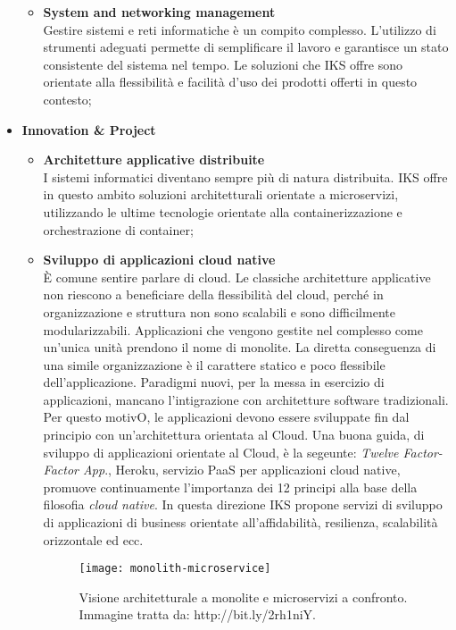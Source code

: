 \begin{itemize}
\begin{itemize}
		\item \textbf{System and networking management}\\
		Gestire sistemi e reti informatiche è un compito complesso. 
		L'utilizzo di strumenti adeguati permette di semplificare il 
		lavoro e garantisce un stato consistente del sistema nel tempo. 
		Le soluzioni che IKS offre sono orientate alla flessibilità e 
		facilità d'uso dei prodotti offerti in questo contesto;
	\end{itemize} 
	\item \textbf{Innovation \& Project} \\
	\begin{itemize}
		\item \textbf{Architetture applicative distribuite}\\
		I sistemi informatici diventano sempre più di natura 
		distribuita. IKS offre in questo ambito soluzioni architetturali 
		orientate a microservizi, utilizzando le ultime tecnologie 
		orientate alla containerizzazione e orchestrazione di container; 
		
		\item \textbf{Sviluppo di applicazioni cloud native}\\
		È comune sentire parlare di cloud. Le classiche 
        architetture applicative non riescono a beneficiare della 
		flessibilità del cloud, perché in organizzazione e struttura 
		non sono scalabili e sono difficilmente modularizzabili. Applicazioni
		che vengono gestite nel complesso come un'unica unità prendono il nome di 
		monolite. La diretta conseguenza di una simile organizzazione è 
		il carattere statico e poco flessibile dell'applicazione. Paradigmi nuovi, 
		per la messa in esercizio di applicazioni, mancano l'intigrazione 
		con architetture software tradizionali. Per questo motivO, 
		le applicazioni devono essere sviluppate fin dal principio con 
		un'architettura orientata al Cloud. Una buona guida, di sviluppo 
		di applicazioni orientate al Cloud, è la segeunte: \textit{Twelve Factor-Factor App}.,
		Heroku, servizio  PaaS per applicazioni cloud native, promuove 
		continuamente l'importanza dei 12 principi alla base della filosofia 
		\emph{cloud native}. In questa direzione IKS propone servizi di sviluppo 
		di applicazioni di business orientate all'affidabilità, resilienza, 
		scalabilità orizzontale ed ecc.
		
		\begin{figure}[htbp]
			\begin{center}		
			\texttt{[image: monolith-microservice]}
			\caption{Visione architetturale a monolite e 
				microservizi a confronto. 
				Immagine tratta da: http://bit.ly/2rh1niY.}
			\end{center}
			\end{figure}
			\end{itemize} 
		\end{itemize}

